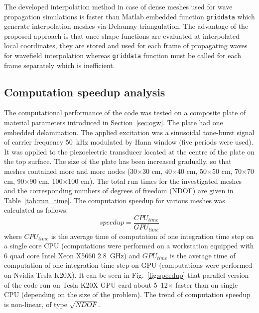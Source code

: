 \documentclass[preprint,12pt]{elsarticle}
\begin{document}
	The developed interpolation method in case of dense meshes used for wave propagation simulations is faster than Matlab embedded function \verb|griddata| which generate interpolation meshes via Delaunay triangulation. The advantage of the proposed approach is that once shape functions are evaluated at interpolated local coordinates, they are stored and used for each frame of propagating waves for wavefield interpolation whereas  \verb|griddata| function must be called for each frame separately which is inefficient.
	
	\subsection{Computation speedup analysis}
	
	The computational performance of the code was tested on a composite plate of material parameters introduced in Section~\ref{sec:ogw}. The plate had one embedded delamination. The applied excitation was a sinusoidal tone-burst signal of carrier frequency 50~kHz modulated by Hann window (five periods were used). It was applied to the piezoelectric transducer located at the centre of the plate on the top surface. The size of the plate has been increased gradually, so that meshes contained more and more nodes (30$\times$30 cm, 40$\times$40 cm, 50$\times$50 cm, 70$\times$70 cm, 90$\times$90 cm, 100$\times$100 cm). The total run times for the investigated meshes and the corresponding numbers of degrees of freedom (NDOF) are given in Table~\ref{tab:run_time}. The computation speedup for various meshes was calculated as follows:
	\begin{equation}
	speedup = \frac{CPU_{time}}{GPU_{time}}
	\label{eq:speedup}
	\end{equation}
	where $CPU_{time}$ is the average time of computation of one integration time step on a single core CPU (computations were performed on a workstation equipped with 6 quad core Intel
	Xeon X5660 2.8~GHz) and $GPU_{time}$ is the average time of computation of one integration time step on
	GPU (computations were performed on Nvidia Tesla K20X). It can be seen in Fig.~\ref{fig:speedup} that parallel version of the code run on Tesla K20X GPU card about 5--12$\times$ faster than on single CPU (depending on the size of the problem). The trend of computation speedup is non-linear, of type $\sqrt{NDOF}$. 
	
\end{document}
